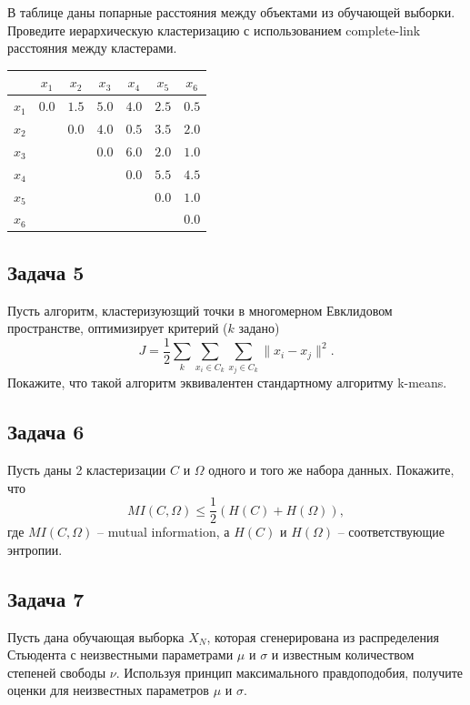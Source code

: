 \documentclass[12pt,a4paper]{article}
\begin{document}
В таблице даны попарные расстояния между объектами из обучающей выборки. Проведите иерархическую кластеризацию с использованием complete-link расстояния между кластерами.

\begin{center}
\begin{tabular}{l | c c c c c c}
 & $x_1$ & $x_2$ & $x_3$ & $x_4$ & $x_5$ & $x_6$ \\
\hline
$x_1$ & $0.0$ & $1.5$ & $5.0$ & $4.0$ & $2.5$ & $0.5$ \\
$x_2$ & & $0.0$ & $4.0$ & $0.5$ & $3.5$ & $2.0$ \\
$x_3$ & & & $0.0$ & $6.0$ & $2.0$ & $1.0$ \\
$x_4$ & & & & $0.0$ & $5.5$ & $4.5$ \\
$x_5$ & & & & & $0.0$ & $1.0$ \\
$x_6$ & & & & & & $0.0$ \\
\end{tabular}
\end{center}

\subsection*{Задача 5}

Пусть алгоритм, кластеризуюзщий точки в многомерном Евклидовом пространстве, оптимизирует критерий ($k$ задано)
\[
J = \frac{1}{2}\sum_{k} \sum_{x_i \in C_k} \sum_{x_j \in C_k} \| x_i - x_j \|^2.
\]
Покажите, что такой алгоритм эквивалентен стандартному алгоритму k-means.

\subsection*{Задача 6}

Пусть даны 2 кластеризации $C$ и $\Omega$ одного и того же набора данных. Покажите, что
\[
MI(C, \Omega) \leq \frac{1}{2} (H(C) + H(\Omega)),
\]
где $MI(C, \Omega)$ -- mutual information, а $H(C)$ и $H(\Omega)$ -- соответствующие энтропии.

\subsection*{Задача 7}

Пусть дана обучающая выборка $X_N$, которая сгенерирована из распределения Стьюдента с неизвестными параметрами $\mu$  и $\sigma$ и известным количеством степеней свободы $\nu$. Используя принцип максимального правдоподобия, получите оценки для неизвестных параметров $\mu$ и $\sigma$.
\end{document}
